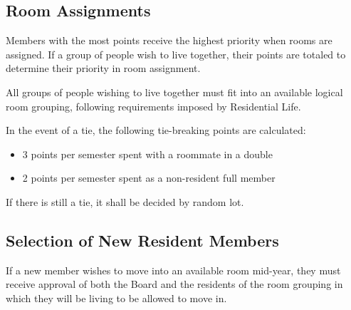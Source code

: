 	\subsection{Room Assignments}

Members with the most points receive the highest priority when rooms are assigned. If a group of people wish to live together, their points are totaled to determine their priority in room assignment.

All groups of people wishing to live together must fit into an available logical room grouping, following requirements imposed by Residential Life.

In the event of a tie, the following tie-breaking points are calculated:
\begin{itemize}
	\item 3 points per semester spent with a roommate in a double
	\item 2 points per semester spent as a non-resident full member
\end{itemize}
If there is still a tie, it shall be decided by random lot.



	\subsection{Selection of New Resident Members}

If a new member wishes to move into an available room mid-year, they must receive approval of both the Board and the residents of the room grouping in which they will be living to be allowed to move in.
